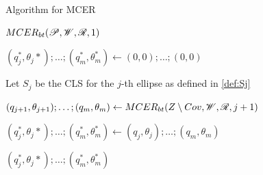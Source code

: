 \begin{algorithm}
	\caption{Algorithm for MCER}\label{algoritmo:mcer}
	\begin{algorithmic}[1]
		
		
		\item[]
		\State \Return $MCER_{bt}(\mathscr{P}, \mathscr{W}, \mathscr{R}, 1)$
		\EndProcedure
		
		\item[]
		
		
		\State $(q_{j}^*,\theta_j*); \dots; (q_m^*, \theta_m^*) \gets (0,0); \dots; (0, 0)$ 
		
		\State Let $S_j$ be the CLS for the $j$-th ellipse as defined in \autoref{def:Sj}
		
		
		\State $(q_{j+1},\theta_{j+1}); \dots; (q_m,\theta_m) \gets  MCER_{bt}(Z\setminus Cov, \mathscr{W}, \mathscr{R}, j+1)$
		\EndIf
		
		
		\State $(q_{j}^*,\theta_j*); \dots; (q_m^*, \theta_m^*) \gets  (q_{j},\theta_{j}); \dots; (q_m,\theta_m) $
		\EndIf
		\EndFor
		
		\State \Return $(q_{j}^*,\theta_j*); \dots; (q_m^*, \theta_m^*)$
		\EndProcedure
	\end{algorithmic}
\end{algorithm}